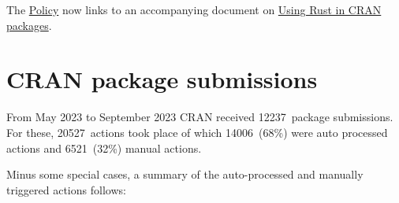 The \href{https://CRAN.R-project.org/web/packages/policies.html}{Policy} now links to an
accompanying document on \href{https://CRAN.R-project.org/web/packages/using_rust.html}{Using Rust in CRAN packages}.

\hypertarget{cran-package-submissions}{%
\section{CRAN package submissions}\label{cran-package-submissions}}

From May 2023 to September 2023
CRAN received 12237~package submissions.
For these, 20527~actions took place of which
14006~(68\%) were auto processed actions and
6521~(32\%) manual actions.

Minus some special cases, a summary of the auto-processed and manually
triggered actions follows:

